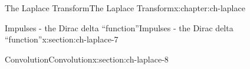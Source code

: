 \documentclass[oneside,10pt,]{book}
\numberwithin{equation}{section}
\numberwithin{equation}{section}
\begin{document}
\begin{chapterptx}{The Laplace Transform}{}{The Laplace Transform}{}{}{x:chapter:ch-laplace}
\begin{sectionptx}{Impulses - the Dirac delta ``function''}{}{Impulses - the Dirac delta ``function''}{}{}{x:section:ch-laplace-7}
\end{sectionptx}
%
%
\typeout{************************************************}
\typeout{************************************************}
%
\begin{sectionptx}{Convolution}{}{Convolution}{}{}{x:section:ch-laplace-8}
\end{sectionptx}
\end{chapterptx}
\end{document}
